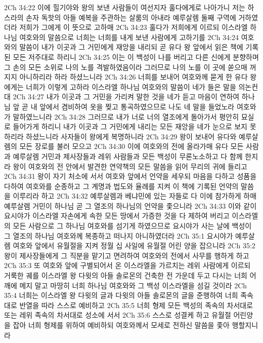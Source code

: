 2Ch 34:22  이에 힐기야와 왕의 보낸 사람들이 여선지자 훌다에게로 나아가니 저는 하스라의 손자 독핫의 아들 예복을 주관하는 살룸의 아내라 예루살렘 둘째 구역에 거하였더라 저희가 그에게 이 뜻으로 고하매
2Ch 34:23  훌다가 저희에게 이르되 이스라엘 하나님 여호와의 말씀으로 너희는 너희를 내게 보낸 사람에게 고하기를
2Ch 34:24  여호와의 말씀이 내가 이곳과 그 거민에게 재앙을 내리되 곧 유다 왕 앞에서 읽은 책에 기록된 모든 저주대로 하리니
2Ch 34:25  이는 이 백성이 나를 버리고 다른 신에게 분향하며 그 손의 모든 소위로 나의 노를 격발하였음이라 그러므로 나의 노를 이 곳에 쏟으매 꺼지지 아니하리라 하라 하셨느니라
2Ch 34:26  너희를 보내어 여호와께 묻게 한 유다 왕에게는 너희가 이렇게 고하라 이스라엘 하나님 여호와의 말씀이 네가 들은 말을 의논컨대
2Ch 34:27  내가 이곳과 그 거민을 가리켜 말한 것을 네가 듣고 마음이 연하여 하나님 앞 곧 내 앞에서 겸비하여 옷을 찢고 통곡하였으므로 나도 네 말을 들었노라 여호와가 말하였느니라
2Ch 34:28  그러므로 내가 너로 너의 열조에게 돌아가서 평안히 묘실로 들어가게 하리니 내가 이곳과 그 거민에게 내리는 모든 재앙을 네가 눈으로 보지 못하리라 하셨느니라 사자들이 왕에게 복명하니라
2Ch 34:29  왕이 보내어 유다와 예루살렘의 모든 장로를 불러 모으고
2Ch 34:30  이에 여호와의 전에 올라가매 유다 모든 사람과 예루살렘 거민과 제사장들과 레위 사람들과 모든 백성이 무론노소하고 다 함께 한지라 왕이 여호와의 전 안에서 발견한 연약책의 모든 말씀을 읽어 무리의 귀에 들리고
2Ch 34:31  왕이 자기 처소에 서서 여호와 앞에서 언약을 세우되 마음을 다하고 성품을 다하여 여호와를 순종하고 그 계명과 법도와 율례를 지켜 이 책에 기록된 언약의 말씀을 이루리라 하고
2Ch 34:32  예루살렘과 베냐민에 있는 자들로 다 이에 참가하게 하매 예루살렘 거민이 하나님 곧 그 열조의 하나님의 언약을 좇으니라
2Ch 34:33  이와 같이 요시야가 이스라엘 자손에게 속한 모든 땅에서 가증한 것을 다 제하여 버리고 이스라엘의 모든 사람으로 그 하나님 여호와를 섬기게 하였으므로 요시야가 사는 날에 백성이 그 열조의 하나님 여호와께 복종하고 떠나지 아니하였더라
2Ch 35:1  요시야가 예루살렘 여호와 앞에서 유월절을 지켜 정월 십 사일에 유월절 어린 양을 잡으니라
2Ch 35:2  왕이 제사장들에게 그 직분을 맡기고 면려하여 여호와의 전에서 사무를 행하게 하고
2Ch 35:3  또 여호와 앞에 구별되어서 온 이스라엘을 가르치는 레위 사람에게 이르되 거룩한 궤를 이스라엘 왕 다윗의 아들 솔로몬의 건축한 전 가운데 두고 다시는 너희 어깨에 메지 말고 마땅히 너희 하나님 여호와와 그 백성 이스라엘을 섬길 것이라
2Ch 35:4  너희는 이스라엘 왕 다윗의 글과 다윗의 아들 솔로몬의 글을 준행하여 너희 족속대로 반열을 따라 스스로 예비하고
2Ch 35:5  너희 형제 모든 백성의 족속의 차서대로 또는 레위 족속의 차서대로 성소에 서서
2Ch 35:6  스스로 성결케 하고 유월절 어린양을 잡아 너희 형제를 위하여 예비하되 여호와께서 모세로 전하신 말씀을 좇아 행할지니라
